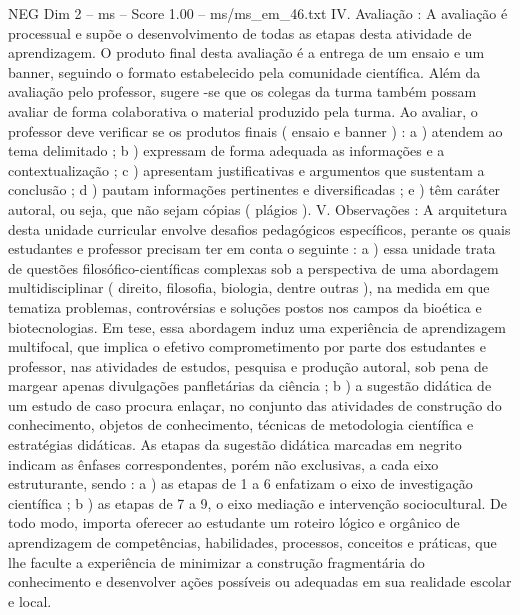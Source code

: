 \begin{textsample}{NEG Dim 2 – ms – Score 1.00 – ms/ms\_em\_46.txt}  \label{ex:f2_neg_247}
IV.
Avaliação : A avaliação é processual e supõe o desenvolvimento de todas as etapas desta atividade de aprendizagem.
O produto final desta avaliação é a entrega de um ensaio e um banner, seguindo o formato estabelecido pela comunidade científica.
Além da avaliação pelo professor, sugere -se que os colegas da turma também possam avaliar de forma colaborativa o material produzido pela turma.
Ao avaliar, o professor deve verificar se os produtos finais ( ensaio e banner ) : a ) atendem ao tema delimitado ; b ) expressam de forma adequada as informações e a contextualização ; c ) apresentam justificativas e argumentos que sustentam a conclusão ; d ) pautam informações pertinentes e diversificadas ; e ) têm caráter autoral, ou seja, que não sejam cópias ( plágios ).
V.
Observações : A arquitetura desta unidade curricular envolve desafios pedagógicos específicos, perante os quais estudantes e professor precisam ter em conta o seguinte : a ) essa unidade trata de questões filosófico-científicas complexas sob a perspectiva de uma abordagem multidisciplinar ( direito, filosofia, biologia, dentre outras ), na medida em que tematiza problemas, controvérsias e soluções postos nos campos da bioética e biotecnologias.
Em tese, essa abordagem induz uma experiência de aprendizagem multifocal, que implica o efetivo comprometimento por parte dos estudantes e professor, nas atividades de estudos, pesquisa e produção autoral, sob pena de margear apenas divulgações panfletárias da ciência ; b ) a sugestão didática de um estudo de caso procura enlaçar, no conjunto das atividades de construção do conhecimento, objetos de conhecimento, técnicas de metodologia científica e estratégias didáticas.
As etapas da sugestão didática marcadas em negrito indicam as ênfases correspondentes, porém não exclusivas, a cada eixo estruturante, sendo : a ) as etapas de 1 a 6 enfatizam o eixo de investigação científica ; b ) as etapas de 7 a 9, o eixo mediação e intervenção sociocultural.
De todo modo, importa oferecer ao estudante um roteiro lógico e orgânico de aprendizagem de competências, habilidades, processos, conceitos e práticas, que lhe faculte a experiência de minimizar a construção fragmentária do conhecimento e desenvolver ações possíveis ou adequadas em sua realidade escolar e local.

\end{textsample}
